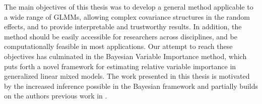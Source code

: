 The main objectives of this thesis was to develop a general method applicable to a wide range of GLMMs, allowing complex covariance structures in the random effects, and to provide interpretable and trustworthy results. In addition, the method should be easily accessible for researchers across disciplines, and be computationally feasible in most applications. Our attempt to reach these objectives has culminated in the Bayesian Variable Importance method, which puts forth a novel framework for estimating relative variable importance in generalized linear mixed models. The work presented in this thesis is motivated by the increased inference possible in the Bayesian framework and partially builds on the authors previous work in \citet{Arnstad:Relative_variable_importance_in_Bayesian_linear_mixed_models:2024}.
\\
\\
